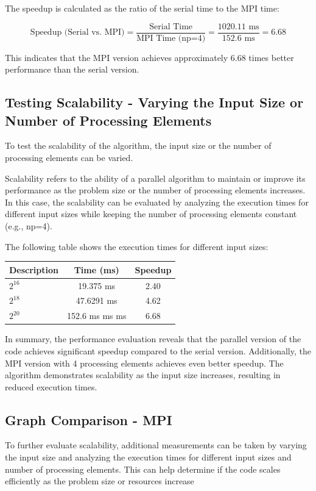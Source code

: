 The speedup is calculated as the ratio of the serial time to the MPI time:

\[
\text{Speedup (Serial vs. MPI)} = \frac{\text{Serial Time}}{\text{MPI Time (np=4)}} = \frac{1020.11 \text{ ms}}{152.6 \text{ ms}} = 6.68
\]

This indicates that the MPI \cite{mpi} version achieves approximately 6.68 times better performance than the serial version.

\subsection*{Testing Scalability - Varying the Input Size or Number of Processing Elements}

To test the scalability of the algorithm, the input size or the number of processing elements can be varied.

Scalability refers to the ability of a parallel algorithm to maintain or improve its performance as the problem size or the number of processing elements increases. In this case, the scalability can be evaluated by analyzing the execution times for different input sizes while keeping the number of processing elements constant (e.g., np=4).

The following table shows the execution times for different input sizes:

\begin{table}[htbp]
  \centering
  \begin{tabular}{lcc}
    \toprule
    \textbf{Description} & \textbf{Time (ms)} & \textbf{Speedup} \\
    \midrule
    $2^{16}$ & 19.375 ms & 2.40 \\
    $2^{18}$ & 47.6291 ms &  4.62 \\
    $2^{20}$ & 152.6 ms ms  ms &  6.68 \\
    \bottomrule
  \end{tabular}
\end{table}

In summary, the performance evaluation reveals that the parallel version of the code achieves significant speedup compared to the serial version. Additionally, the MPI version with 4 processing elements achieves even better speedup. The algorithm demonstrates scalability as the input size increases, resulting in reduced execution times.

\subsection{Graph Comparison - MPI}
To further evaluate scalability, additional measurements can be taken by varying the input size and analyzing the execution times for different input sizes and number of processing elements. This can help determine if the code scales efficiently as the problem size or resources increase

